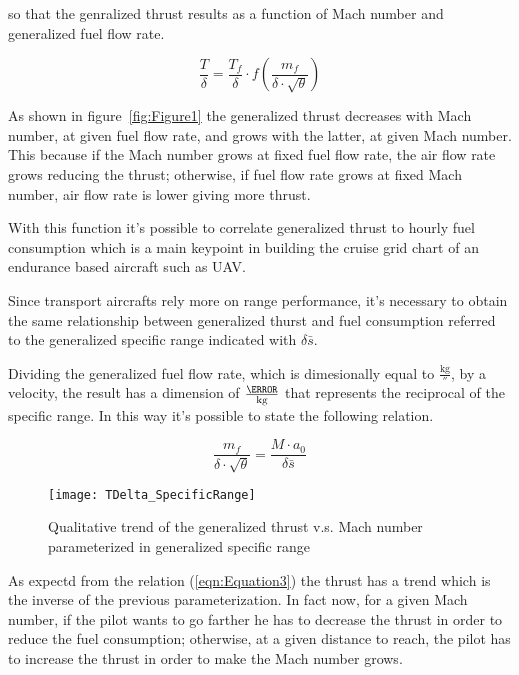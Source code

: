 \noindent
so that the genralized thrust results as a function of Mach number and generalized fuel flow rate.

\begin{equation}
\frac{T}{\delta}=\frac{T_{f}}{\delta}\cdot f\left(\frac{m_{f}}{\delta \cdot \sqrt{\theta}}\right)
\label{eqn:Equation2}
\end{equation}

\bigskip
\noindent
As shown in figure~\ref{fig:Figure1} the generalized thrust decreases with Mach number, at given fuel flow rate, and grows with the latter, at given Mach number. This because if the Mach number grows at fixed fuel flow rate, the air flow rate grows reducing the thrust; otherwise, if fuel flow rate grows at fixed Mach number, air flow rate is lower giving more thrust.

With this function it's possible to correlate generalized thrust to hourly fuel consumption which is a main keypoint in building the cruise grid chart of an endurance based aircraft such as UAV. 

Since transport aircrafts rely more on range performance, it's necessary to obtain the same relationship between generalized thurst and fuel consumption referred to the generalized specific range indicated with $\delta\bar s $. 

\bigskip
\noindent
Dividing the generalized fuel flow rate, which is dimesionally equal to $\frac{\si{\kilogram}}{\second}$, by a velocity, the result has a dimension of $\frac{\meter}{\si{\kilogram}}$ that represents the reciprocal of the specific range. In this way it's possible to state the following relation.

\begin{equation}
\frac{m_{f}}{\delta \cdot \sqrt{\theta}}=\frac{M\cdot a_{0}}{\delta\bar s}
\label{eqn:Equation3}
\end{equation}

\begin{figure}[!ht]
\centering
\texttt{[image: TDelta\_SpecificRange]}
\caption{Qualitative trend of the generalized thrust v.s. Mach number parameterized in generalized specific range}
\label{fig:Figure2}
\end{figure}

\bigskip
\noindent
As expectd from the relation (\ref{eqn:Equation3}) the thrust has a trend which is the inverse of the previous parameterization. In fact now, for a given Mach number, if the pilot wants to go farther he has to decrease the thrust in order to reduce the fuel consumption; otherwise, at a given distance to reach, the pilot has to increase the thrust in order to make the Mach number grows.

